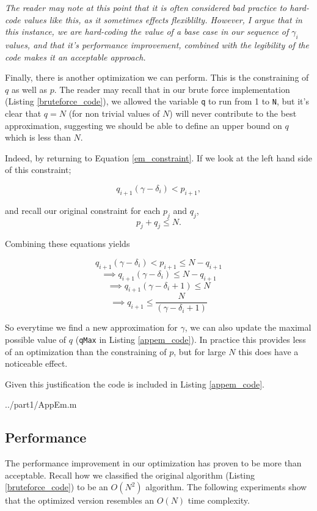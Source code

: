 \documentclass[10pt]{article}
\newcommand*{\gam}{$\gamma$}
\newcommand*{\gami}{$\gamma_{i}$}
\begin{document}
\emph{The reader may note at this point that it is often considered bad practice to hard-code values like this, as it sometimes effects flexiblilty. However, I argue that in this instance, we are hard-coding the value of a base case in our sequence of \gami $ $ values, and that it's performance improvement, combined with the legibility of the code makes it an acceptable approach.}

Finally, there is another optimization we can perform.  This is the constraining of $q$ as well as $p$. The reader may recall that in our brute force implementation (Listing \ref{bruteforce_code}), we allowed the variable \texttt{q} to run from 1 to \texttt{N}, but it's clear that $q = N$ (for non trivial values of $N$) will never contribute to the best approximation, suggesting we should be able to define an upper bound on $q$ which is less than $N$.

Indeed, by returning to Equation \ref{em_constraint}. If we look at the left hand side of this constraint;

$$q_{i+1} (\gamma - \delta_i) < p_{i+1} ,$$

and recall our original constraint for each $p_j$ and $q_j$,
$$ p_j + q_j \leq N .$$

Combining these equations yields

$$ q_{i+1} (\gamma - \delta_i) < p_{i+1} \leq N - q_{i+1}$$ 
$$ \implies  q_{i+1} (\gamma - \delta_i) \leq N - q_{i+1} $$ 
$$ \implies q_{i+1} (\gamma - \delta_i + 1) \leq N  $$ 
$$ \implies q_{i+1}  \leq \frac{N}{(\gamma - \delta_i + 1)}  $$ 

So everytime we find a new approximation for \gam, we can also update the maximal possible value of $q$ (\texttt{qMax} in Listing \ref{appem_code}). In practice this provides less of an optimization than the constraining of $p$, but for large $N$ this does have a noticeable effect.

Given this justification the code is included in Listing \ref{appem_code}.

   {../part1/AppEm.m}

\subsection{Performance}

The performance improvement in our optimization has proven to be more than acceptable. Recall how we classified the original algorithm (Listing \ref{bruteforce_code}) to be an $O(N^2)$ algorithm. The following experiments show that the optimized version resembles an $O(N)$ time complexity.
\end{document}
